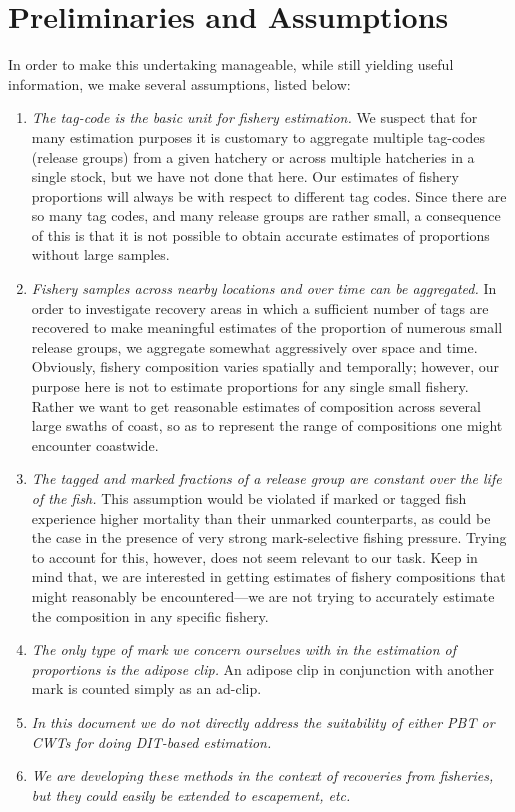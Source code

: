 \documentclass[11pt]{article}
\makeatletter
\newcommand{\etc}{{\em etc.}\@\xspace}
\makeatother
\begin{document}
\section{Preliminaries and Assumptions \label{sec:prelims}}

In order to make this undertaking manageable, while still yielding useful information, we make several
assumptions, listed below:
\begin{enumerate}
\item {\sl The tag-code is the basic unit for fishery estimation.} We suspect that for many estimation purposes
it is customary to aggregate multiple tag-codes (release groups) from a given hatchery or across multiple
hatcheries in a single stock, but we have not done that here.  Our estimates of fishery proportions will
always be with respect to different tag codes.  Since there are so many tag codes, and many release groups
are rather small, a consequence of this is that it is not possible to obtain accurate estimates of proportions
without large samples.
\item {\sl Fishery samples across nearby locations and over time can be aggregated. } In order to investigate
recovery areas in which a sufficient number of tags are recovered to make meaningful estimates
of the proportion of numerous small release groups, we aggregate somewhat aggressively over space and time. 
Obviously, fishery composition varies spatially and temporally; however, our purpose here is not to estimate
proportions for any single small fishery.  Rather we want to get reasonable estimates of composition across
several large swaths of coast, so as to represent the range of compositions one might encounter 
coastwide.  
\item {\sl The tagged and marked fractions of a release group are constant over the life of the fish.}  This
assumption would be violated if marked or tagged fish experience higher mortality than their unmarked
counterparts, as could be the case in the presence of very strong mark-selective fishing pressure.  Trying to
account for this, however, does not seem relevant to our task. Keep in mind that, we are interested in
getting estimates of fishery compositions that might reasonably be encountered---we are not trying to accurately
estimate the composition in any specific fishery.
\item {\sl The only type of mark we concern ourselves with in the estimation of proportions is the
adipose clip.}  An adipose clip in conjunction with another mark is counted simply as an ad-clip.
\item {\sl In this document we do not directly address the suitability of either PBT or CWTs for doing DIT-based estimation.}
\item {\sl We are developing these methods in the context of recoveries from fisheries, but they could easily be
extended to escapement, \etc}
\end{enumerate}
\end{document}
